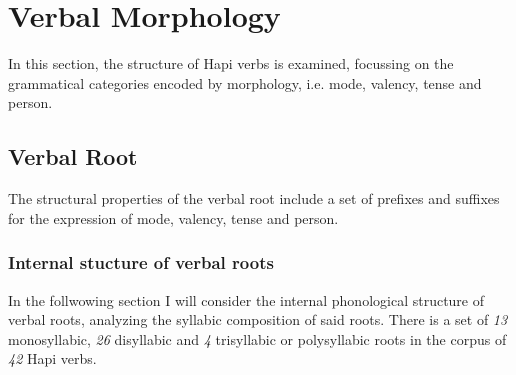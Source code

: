 \documentclass[a4paper, 12pt, oneside]{memoir}
\begin{document}
\section{Verbal Morphology}
In this section, the structure of Hapi verbs is examined, focussing on the grammatical categories encoded by morphology, i.e. mode, valency, tense and person.
\subsection{Verbal Root}\label{sverbalroot}
The structural properties of the verbal root include a set of prefixes and suffixes for the expression of mode, valency, tense and person. 
\subsubsection{Internal stucture of verbal roots}
In the follwowing section I will consider the internal phonological structure of verbal roots, analyzing the syllabic composition of said roots. 
There is a set of \textit{13} monosyllabic, \textit{26} disyllabic and \textit{4} trisyllabic or polysyllabic roots in the corpus of \textit{42} Hapi verbs.
\end{document}
